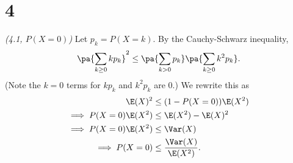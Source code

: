 \section{4}
\begin{problem} {\it (4.1, $P(X=0)$)}
%
Let $p_k=P(X=k)$. By the Cauchy-Schwarz inequality,
\[
\pa{
\sum_{k\ge 0}kp_k
}^2\le \pa{\sum_{k>0} p_k}\pa{\sum_{k\ge 0} k^2p_k}.
\]
(Note the $k=0$ terms for $kp_k$ and $k^2p_k$ are 0.) We rewrite this as
\begin{align*}
\E(X)^2&\le (1-P(X=0))\E(X^2)\\
\implies P(X=0)\E(X^2)&\le \E(X^2)-\E(X)^2\\
\implies P(X=0)\E(X^2)&\le \Var(X)\\
\implies P(X=0)&\le \frac{\Var(X)}{\E(X^2)}.
\end{align*}

\end{problem}
